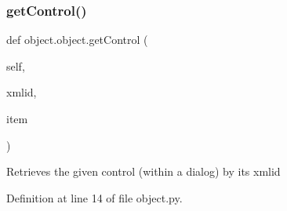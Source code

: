 \subsubsection{\texorpdfstring{get\+Control()}{getControl()}\hspace{0.1cm}{\footnotesize\ttfamily [1/2]}}
{\footnotesize\ttfamily def object.\+object.\+get\+Control (\begin{DoxyParamCaption}\item[{}]{self,  }\item[{}]{xmlid,  }\item[{}]{item }\end{DoxyParamCaption})}

\begin{DoxyVerb}Retrieves the given control (within a dialog) by its xmlid\end{DoxyVerb}
 

Definition at line 14 of file object.\+py.



